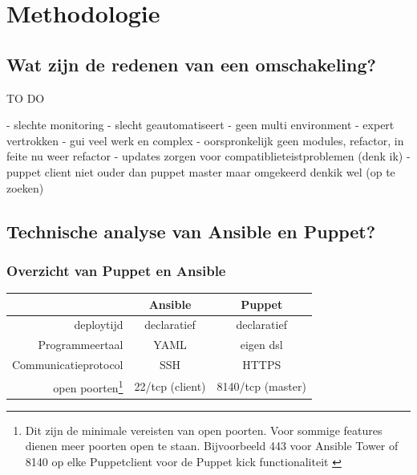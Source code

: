 
\chapter{Methodologie}
\label{ch:methodologie}


\section{Wat zijn de redenen van een omschakeling?}
\label{sec:methodologie-redenen-omschakeling}

TO DO

- slechte monitoring
- slecht geautomatiseert 
- geen multi environment
- expert vertrokken
- gui veel werk en complex
- oorspronkelijk geen modules, refactor, in feite nu weer refactor
- updates zorgen voor compatiblieteistproblemen (denk ik)
- puppet client niet ouder dan puppet master maar omgekeerd denkik wel (op te zoeken)

\section{Technische analyse van Ansible en Puppet?}
\label{sec:methodologie-technische-verschillen}

\subsection{Overzicht van Puppet en Ansible}

\begin{minipage}{15cm}
\begin{tabular}{ r |c c }
& \textbf{Ansible} & \textbf{Puppet} \\
  \hline	  		
\gls{deploytijd}  & declaratief & declaratief  \\
   \hline
 Programmeertaal & YAML & eigen \gls{dsl}  \\
     \hline
   Communicatieprotocol & SSH & HTTPS \\
   \hline
   open poorten\footnote{Dit zijn de minimale vereisten van open poorten. Voor sommige features dienen meer poorten open te staan. Bijvoorbeeld 443 voor Ansible Tower of 8140 op elke Puppetclient voor de Puppet kick functionaliteit \autocite{puppetkick} }  & 22/tcp (client) & 8140/tcp (master)\\
  \end{tabular}
  \end{minipage}   



